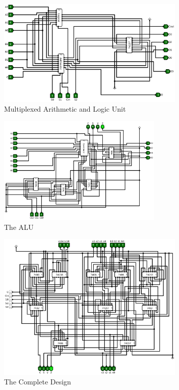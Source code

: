 \documentclass[12pt]{article}
\begin{document}
     \begin{figure}[H]
         \centering
         \includegraphics[width=0.8\textwidth]{Combined.png}
         \caption{Multiplexed Arithmetic and Logic Unit}
         \label{fig:alu_d}
     \end{figure}

     \begin{figure}[H]
         \centering
         \includegraphics[width=0.7\textwidth]{ALU.png}
         \caption{The ALU}
         \label{fig:alu_e}
     \end{figure}



\begin{figure}[H]
    \centering
    \includegraphics[width=0.8\textwidth]{combined.png}
    \caption{The Complete Design}
    \label{fig:comb}
\end{figure}
\end{document}
